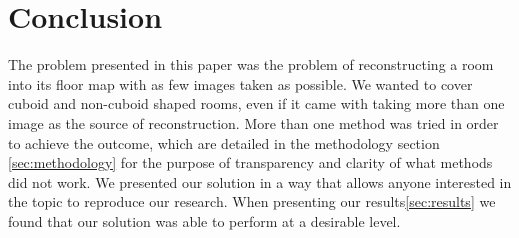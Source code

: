 \section{Conclusion}
The problem presented in this paper was the problem of reconstructing a room into its floor map with as few images taken as possible. We wanted to cover cuboid and non-cuboid shaped rooms, even if it came with taking more than one image as the source of reconstruction. More than one method was tried in order to achieve the outcome, which are detailed in the methodology section \ref{sec:methodology} for the purpose of transparency and clarity of what methods did not work. We presented our solution in a way that allows anyone interested in the topic to reproduce our research. When presenting our results\ref{sec:results} we found that our solution was able to perform at a desirable level.